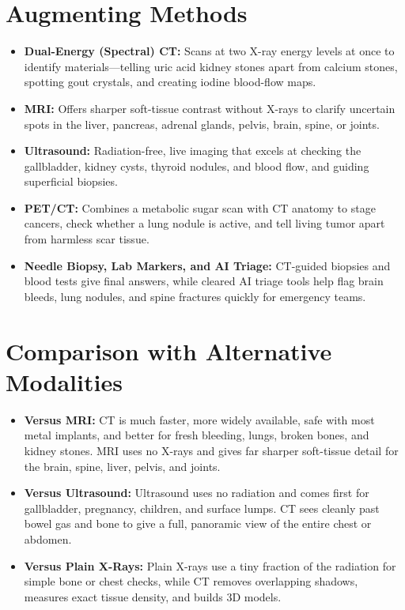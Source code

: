 \section{Augmenting Methods}
\begin{itemize}
    \item \textbf{Dual-Energy (Spectral) CT:} Scans at two X-ray energy levels at once to identify materials---telling uric acid kidney stones apart from calcium stones, spotting gout crystals, and creating iodine blood-flow maps.
    \item \textbf{MRI:} Offers sharper soft-tissue contrast without X-rays to clarify uncertain spots in the liver, pancreas, adrenal glands, pelvis, brain, spine, or joints.
    \item \textbf{Ultrasound:} Radiation-free, live imaging that excels at checking the gallbladder, kidney cysts, thyroid nodules, and blood flow, and guiding superficial biopsies.
    \item \textbf{PET/CT:} Combines a metabolic sugar scan with CT anatomy to stage cancers, check whether a lung nodule is active, and tell living tumor apart from harmless scar tissue.
    \item \textbf{Needle Biopsy, Lab Markers, and AI Triage:} CT-guided biopsies and blood tests give final answers, while cleared AI triage tools help flag brain bleeds, lung nodules, and spine fractures quickly for emergency teams.
\end{itemize}

\section{Comparison with Alternative Modalities}
\begin{itemize}
    \item \textbf{Versus MRI:} CT is much faster, more widely available, safe with most metal implants, and better for fresh bleeding, lungs, broken bones, and kidney stones. MRI uses no X-rays and gives far sharper soft-tissue detail for the brain, spine, liver, pelvis, and joints.
    \item \textbf{Versus Ultrasound:} Ultrasound uses no radiation and comes first for gallbladder, pregnancy, children, and surface lumps. CT sees cleanly past bowel gas and bone to give a full, panoramic view of the entire chest or abdomen.
    \item \textbf{Versus Plain X-Rays:} Plain X-rays use a tiny fraction of the radiation for simple bone or chest checks, while CT removes overlapping shadows, measures exact tissue density, and builds 3D models.
\end{itemize}


